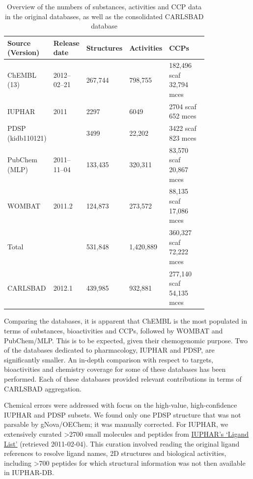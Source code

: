 \begin{table}
\caption{Overview of the numbers of substances, activities and CCP data in the original databases, as well as the consolidated CARLSBAD database}
\label{tab:cb_02}
\centering
\begin{tabular}{p{0.2\linewidth}p{0.12\linewidth}p{0.12\linewidth}p{0.12\linewidth}p{0.25\linewidth}}
\hline
\textbf{Source (Version)} & \textbf{Release date} & \textbf{Structures} & \textbf{Activities} & \textbf{CCPs}\\
\hline
ChEMBL (13) & 2012–02–21 & 267,744 & 798,755 & \makecell[l]{182,496 scaf\\ 32,794 mces}\\
IUPHAR & 2011 & 2297 & 6049 & \makecell[l]{2704 scaf\\ 652 mces}\\
PDSP (kidb110121) & & 3499 & 22,202 & \makecell[l]{3422 scaf\\ 823 mces}\\
PubChem (MLP) & 2011–11–04 & 133,435 & 320,311 & \makecell[l]{83,570 scaf\\ 20,867 mces}\\
WOMBAT & 2011.2 & 124,873  & 273,572 & \makecell[l]{88,135 scaf\\ 17,086 mces}\\
\hline
Total & & 531,848 & 1,420,889 & \makecell[l]{360,327 scaf\\ 72,222 mces}\\
\hline
CARLSBAD & 2012.1 & 439,985 & 932,881 & \makecell[l]{277,140 scaf\\ 54,135 mces}\\
\hline
\end{tabular}
\end{table}

Comparing the databases, it is apparent that ChEMBL is the most populated in terms of substances, bioactivities and CCPs, followed by WOMBAT and PubChem/MLP. This is to be expected, given their chemogenomic purpose. Two of the databases dedicated to pharmacology, IUPHAR and PDSP, are significantly smaller. An in-depth comparison with respect to targets, bioactivities and chemistry coverage for some of these databases has been performed\cite{Tiikkainen2012-cw}. Each of these databases provided relevant contributions in terms of CARLSBAD aggregation.

Chemical errors were addressed with focus on the high-value, high-confidence IUPHAR and PDSP subsets. We found only one PDSP structure that was not parsable by gNova/OEChem; it was manually corrected. For IUPHAR, we extensively curated \textgreater 2700 small molecules and peptides from \href{http://www.iuphar-db.org/DATABASE/LigandListForward}{IUPHAR’s ‘Ligand List’} (retrieved 2011-02-04). This curation involved reading the original ligand references to resolve ligand names, 2D structures and biological activities, including \textgreater700 peptides for which structural information was not then available in IUPHAR-DB\cite{Harding2018-ut}. 

